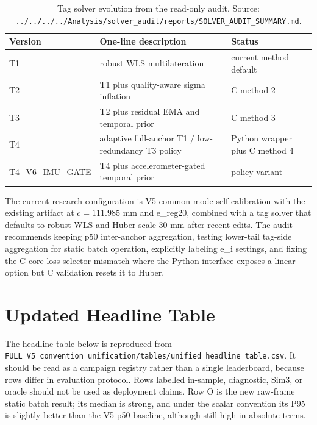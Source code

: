 \documentclass[11pt,a4paper]{article}
\begin{document}
\begin{table}[H]
\centering
\caption{Tag solver evolution from the read-only audit. Source: \texttt{../../../../Analysis/solver\_audit/reports/SOLVER\_AUDIT\_SUMMARY.md}.}
\label{tab:tag_solver}
\small
\begin{tabular}{@{}p{28mm}p{80mm}p{36mm}@{}}
\toprule
Version & One-line description & Status \\
\midrule
T1 & robust WLS multilateration & current method default \\
T2 & T1 plus quality-aware sigma inflation & C method 2 \\
T3 & T2 plus residual EMA and temporal prior & C method 3 \\
T4 & adaptive full-anchor T1 / low-redundancy T3 policy & Python wrapper plus C method 4 \\
T4\_V6\_IMU\_GATE & T4 plus accelerometer-gated temporal prior & policy variant \\
\bottomrule
\end{tabular}
\end{table}

The current research configuration is V5 common-mode self-calibration with the existing artifact at $c=111.985$ mm and e\_reg20, combined with a tag solver that defaults to robust WLS and Huber scale 30 mm after recent edits. The audit recommends keeping p50 inter-anchor aggregation, testing lower-tail tag-side aggregation for static batch operation, explicitly labeling e\_i settings, and fixing the C-core loss-selector mismatch where the Python interface exposes a linear option but C validation resets it to Huber.

\section{Updated Headline Table}

The headline table below is reproduced from \texttt{FULL\_V5\_convention\_unification/tables/unified\_headline\_table.csv}. It should be read as a campaign registry rather than a single leaderboard, because rows differ in evaluation protocol. Rows labelled in-sample, diagnostic, Sim3, or oracle should not be used as deployment claims. Row O is the new raw-frame static batch result; its median is strong, and under the scalar convention its P95 is slightly better than the V5 p50 baseline, although still high in absolute terms.
\end{document}
